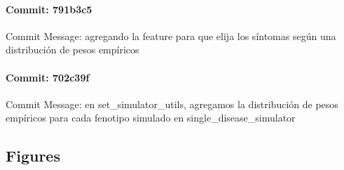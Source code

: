 \documentclass{article}
\begin{document}
\paragraph{Commit: 791b3c5}
Commit Message: agregando la feature para que elija los síntomas según una distribución de pesos empíricos

\paragraph{Commit: 702c39f}
Commit Message: en set_simulator_utils, agregamos la distribución de pesos empíricos para cada fenotipo simulado en single_disease_simulator

\subsection{Figures}
\end{document}
